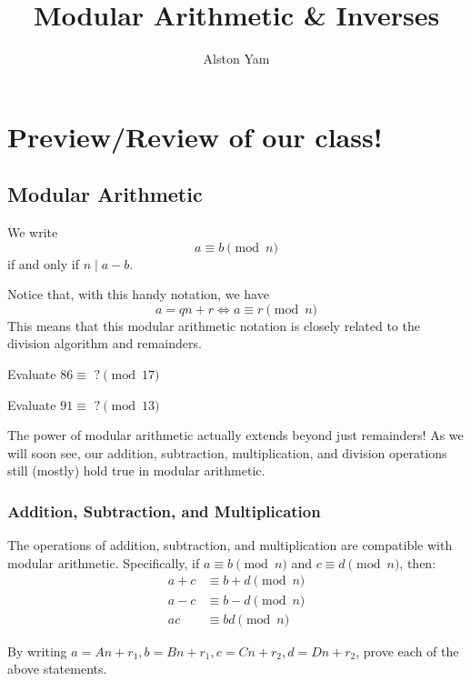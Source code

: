 \documentclass{article}
\title{Modular Arithmetic \& Inverses}
\date{}
\author{Alston Yam}
\theoremstyle{mytheoremstyle}
\theoremstyle{mytheoremstyle}
\theoremstyle{myproblemstyle}
\theoremstyle{myproblemstyle}
\theoremstyle{myproblemstyle}
\begin{document}
    \maketitle
    \section{Preview/Review of our class!}
    \subsection{Modular Arithmetic}
    \begin{definition}
        We write $$a \equiv b \pmod{n}$$ if and only if $n \mid a - b$.
    \end{definition}
    Notice that, with this handy notation, we have  $$a = qn + r \iff a \equiv r \pmod{n}$$ This means that this modular arithmetic notation is closely related to the division algorithm and remainders.
    
    \begin{exercise}
        Evaluate $86 \equiv \text{ ?} \pmod{17}$
    \end{exercise}
    \begin{exercise}
        Evaluate $91 \equiv \text{ ?} \pmod{13}$
    \end{exercise}

    \vspace{3pt}
    The power of modular arithmetic actually extends beyond just remainders! As we will soon see, our addition, subtraction, multiplication, and division operations still (mostly) hold true in modular arithmetic.

    \subsubsection{Addition, Subtraction, and Multiplication}
    The operations of addition, subtraction, and multiplication are compatible with modular arithmetic. Specifically, if $a \equiv b \pmod{n}$ and $c \equiv d \pmod{n}$, then:
    \begin{align*}
        a + c &\equiv b + d \pmod{n} \\
        a - c &\equiv b - d \pmod{n} \\
        ac &\equiv bd \pmod{n}
    \end{align*}

    \begin{exercise}
        By writing $a = An + r_1, b = Bn + r_1, c = Cn + r_2, d = Dn + r_2$, prove each of the above statements.
    \end{exercise}
\end{document}
